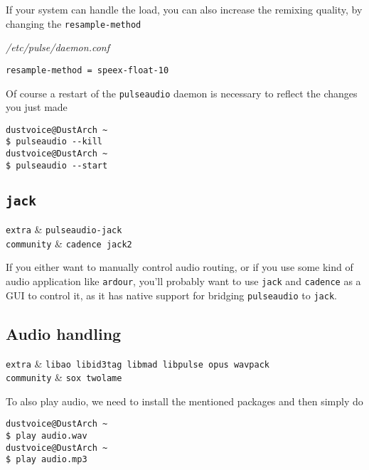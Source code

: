 \documentclass[10pt]{dustdoc}
\begin{document}
If your system can handle the load, you can also increase the remixing quality, by changing the \texttt{resample-method}

\begin{mintedlisting}
    \caption*{\textit{/etc/pulse/daemon.conf}}
    \begin{verbatim}
resample-method = speex-float-10
    \end{verbatim}
\end{mintedlisting}

Of course a restart of the \texttt{pulseaudio} daemon is necessary to reflect the changes you just made

\begin{verbatim}
dustvoice@DustArch ~
$ pulseaudio --kill
dustvoice@DustArch ~
$ pulseaudio --start
\end{verbatim}

\subsection{\texttt{jack}}
\label{sec:jack}

\begin{packagetable}
    \texttt{extra} & \texttt{pulseaudio-jack} \\
    \texttt{community} & \texttt{cadence jack2} \\
\end{packagetable}

If you either want to manually control audio routing, or if you use some kind of audio application like \texttt{ardour}, you’ll probably want to use \texttt{jack} and \texttt{cadence} as a GUI to control it, as it has native support for bridging \texttt{pulseaudio} to \texttt{jack}.

\subsection{Audio handling}
\label{sec:audio-handling}

\begin{packagetable}
    \texttt{extra} & \texttt{libao libid3tag libmad libpulse opus wavpack} \\
    \texttt{community} & \texttt{sox twolame} \\
\end{packagetable}

To also play audio, we need to install the mentioned packages and then simply do

\begin{verbatim}
dustvoice@DustArch ~
$ play audio.wav
dustvoice@DustArch ~
$ play audio.mp3
\end{verbatim}
\end{document}
